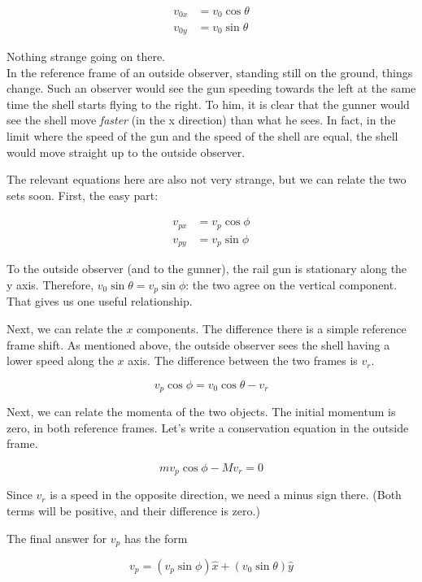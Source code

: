\documentclass[12pt,a4paper]{report}
\begin{document}
\begin{align}
v_{0x} &= v_0 \cos \theta\\
v_{0y} &= v_0 \sin \theta
\end{align}

Nothing strange going on there.\\
In the reference frame of an outside observer, standing still on the ground, things change. Such an observer would see the gun speeding towards the left at the same time the shell starts flying to the right. To him, it is clear that the gunner would see the shell move \emph{faster} (in the x direction) than what he sees. In fact, in the limit where the speed of the gun and the speed of the shell are equal, the shell would move straight up to the outside observer.

The relevant equations here are also not very strange, but we can relate the two sets soon. First, the easy part:

\begin{align}
v_{px} &= v_p \cos \phi\\
v_{py} &= v_p \sin \phi
\end{align}

To the outside observer (and to the gunner), the rail gun is stationary along the y axis. Therefore, $v_0 \sin \theta = v_p \sin \phi$: the two agree on the vertical component. That gives us one useful relationship.

Next, we can relate the $x$ components. The difference there is a simple reference frame shift. As mentioned above, the outside observer sees the shell having a lower speed along the $x$ axis. The difference between the two frames is $v_r$.

\begin{equation}
v_p \cos \phi = v_0 \cos \theta - v_r
\end{equation}

Next, we can relate the momenta of the two objects. The initial momentum is zero, in both reference frames. Let's write a conservation equation in the outside frame.

\begin{equation}
m v_p \cos \phi - M v_r = 0
\end{equation}

Since $v_r$ is a speed in the opposite direction, we need a minus sign there. (Both terms will be positive, and their difference is zero.)

The final answer for $v_p$ has the form

\begin{equation}
v_p = (v_p \sin \phi) \hat{x} + (v_0 \sin \theta) \hat{y}
\end{equation}
\end{document}
